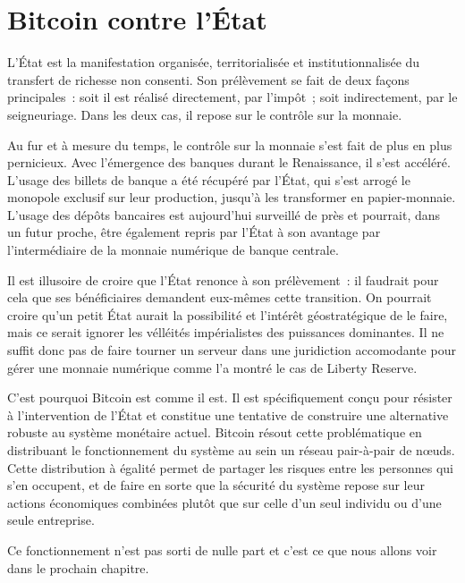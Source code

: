 \section*{Bitcoin contre l'État} %

L'État est la manifestation organisée, territorialisée et institutionnalisée du transfert de richesse non consenti. Son prélèvement se fait de deux façons principales~: soit il est réalisé directement, par l'impôt~; soit indirectement, par le seigneuriage. Dans les deux cas, il repose sur le contrôle sur la monnaie.

Au fur et à mesure du temps, le contrôle sur la monnaie s'est fait de plus en plus pernicieux. Avec l'émergence des banques durant le Renaissance, il s'est accéléré. L'usage des billets de banque a été récupéré par l'État, qui s'est arrogé le monopole exclusif sur leur production, jusqu'à les transformer en papier-monnaie. L'usage des dépôts bancaires est aujourd'hui surveillé de près et pourrait, dans un futur proche, être également repris par l'État à son avantage par l'intermédiaire de la monnaie numérique de banque centrale.


Il est illusoire de croire que l'État renonce à son prélèvement~: il faudrait pour cela que ses bénéficiaires demandent eux-mêmes cette transition. On pourrait croire qu'un petit État aurait la possibilité et l'intérêt géostratégique de le faire, mais ce serait ignorer les vélléités impérialistes des puissances dominantes. Il ne suffit donc pas de faire tourner un serveur dans une juridiction accomodante pour gérer une monnaie numérique comme l'a montré le cas de Liberty Reserve.

C'est pourquoi Bitcoin est comme il est. Il est spécifiquement conçu pour résister à l'intervention de l'État et constitue une tentative de construire une alternative robuste au système monétaire actuel. Bitcoin résout cette problématique en distribuant le fonctionnement du système au sein un réseau pair-à-pair de nœuds. Cette distribution à égalité permet de partager les risques entre les personnes qui s'en occupent, et de faire en sorte que la sécurité du système repose sur leur actions économiques combinées plutôt que sur celle d'un seul individu ou d'une seule entreprise.

Ce fonctionnement n'est pas sorti de nulle part et c'est ce que nous allons voir dans le prochain chapitre.

\printendnotes